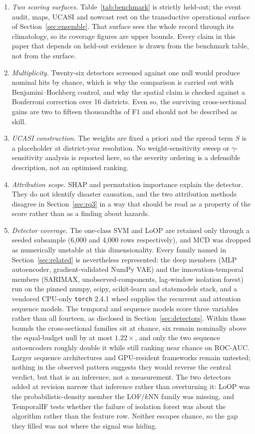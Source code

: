 \documentclass[preprint,12pt]{elsarticle}
\begin{document}
\begin{enumerate}
\item \emph{Two scoring surfaces.} Table~\ref{tab:benchmark} is strictly held-out;
the event audit, maps, UCASI and nowcast rest on the transductive operational
surface of Section~\ref{sec:ensemble}. That surface sees the whole record through
its climatology, so its coverage figures are upper bounds. Every claim in this
paper that depends on held-out evidence is drawn from the benchmark table, not
from the surface.

\item \emph{Multiplicity.} Twenty-six detectors screened against one null would
produce nominal hits by chance, which is why the comparison is carried out with
Benjamini--Hochberg control, and why the spatial claim is checked against a
Bonferroni correction over 16 districts. Even so, the surviving cross-sectional
gains are two to fifteen thousandths of F1 and should not be described as skill.

\item \emph{UCASI construction.} The weights are fixed a priori and the spread
term $S$ is a placeholder at district-year resolution. No weight-sensitivity sweep
or $\gamma$-sensitivity analysis is reported here, so the severity ordering is a
defensible description, not an optimised ranking.

\item \emph{Attribution scope.} SHAP and permutation importance explain the
detector. They do not identify disaster causation, and the two attribution methods
disagree in Section~\ref{sec:rq3} in a way that should be read as a property of
the score rather than as a finding about hazards.

\item \emph{Detector coverage.} The one-class SVM and LoOP are retained only
through a seeded subsample (6{,}000 and 4{,}000 rows respectively), and MCD was
dropped as numerically unstable at this
dimensionality. Every family named in Section~\ref{sec:related} is nevertheless
represented: the deep members (MLP autoencoder, gradient-validated NumPy VAE) and
the innovation-temporal members (SARIMAX, unobserved-components, lag-window
isolation forest) run on the pinned
numpy, scipy, scikit-learn and statsmodels stack, and a vendored CPU-only
\texttt{torch} 2.4.1 wheel supplies the recurrent and attention sequence models.
The temporal and sequence models score three variables rather than all fourteen, as
disclosed in Section~\ref{sec:detectors}. Within those bounds the cross-sectional
families sit at chance, six remain nominally above the equal-budget null by at most
$1.22\times$, and only the two sequence autoencoders roughly double it while still
ranking near chance on ROC-AUC. Larger sequence architectures and GPU-resident
frameworks remain untested; nothing in the observed pattern suggests they would
reverse the central verdict, but that is an inference, not a measurement. The two
detectors added at revision narrow that inference rather than overturning it: LoOP
was the probabilistic-density member the LOF/$k$NN family was missing, and
TemporalIF tests whether the failure of isolation forest was about the algorithm
rather than the feature row. Neither escapes chance, so the gap they filled was not
where the signal was hiding.


\end{enumerate}
\end{document}
